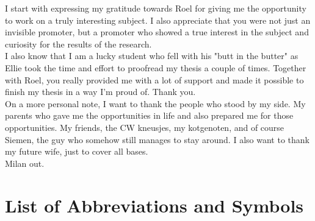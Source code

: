 \documentclass[master=ecws,masteroption=ai]{kulemt}
\begin{document}
\begin{preface}
 
I start with expressing my gratitude towards Roel for giving me the opportunity to work on a truly interesting subject. I also appreciate that you were not just an invisible promoter, but a promoter who showed a true interest in the subject and curiosity for the results of the research. \\
I also know that I am a lucky student who fell with his "butt in the butter" as Ellie took the time and effort to proofread my thesis a couple of times. Together with Roel, you really provided me with a lot of support and made it possible to finish my thesis in a way I'm proud of. Thank you. \\
On a  more personal note, I want to thank the people who stood by my side. My parents who gave me the opportunities in life and also prepared me for those opportunities. My friends, the CW kneusjes, my kotgenoten, and of course Siemen, the guy who somehow still manages to stay around. I also want to thank my future wife, just to cover all bases. \\

\noindent Milan out.
 
\end{preface}

\tableofcontents*

\begin{abstract}

  \lipsum[1]
\end{abstract}

\listoffiguresandtables
\chapter{List of Abbreviations and Symbols}
\end{document}
